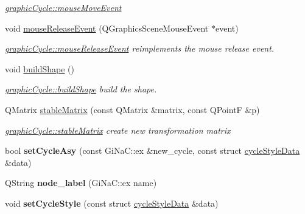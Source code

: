 \begin{DoxyCompactItemize}
\begin{DoxyCompactList}\small\item\em \mbox{\hyperlink{classgraphic_cycle_aec6514c9578de68150bf2eea9b4e80c4}{graphic\+Cycle\+::mouse\+Move\+Event}} \end{DoxyCompactList}\item 
void \mbox{\hyperlink{classgraphic_cycle_a10c7318e9cf6d79e0aad3eec5c1d697a}{mouse\+Release\+Event}} (Q\+Graphics\+Scene\+Mouse\+Event $\ast$event)
\begin{DoxyCompactList}\small\item\em \mbox{\hyperlink{classgraphic_cycle_a10c7318e9cf6d79e0aad3eec5c1d697a}{graphic\+Cycle\+::mouse\+Release\+Event}} reimplements the mouse release event. \end{DoxyCompactList}\item 
void \mbox{\hyperlink{classgraphic_cycle_ac3a007a95334380db1bcd9b8082cb36c}{build\+Shape}} ()
\begin{DoxyCompactList}\small\item\em \mbox{\hyperlink{classgraphic_cycle_ac3a007a95334380db1bcd9b8082cb36c}{graphic\+Cycle\+::build\+Shape}} build the shape. \end{DoxyCompactList}\item 
Q\+Matrix \mbox{\hyperlink{classgraphic_cycle_a1c3a094ad53a3705019c24869340ed51}{stable\+Matrix}} (const Q\+Matrix \&matrix, const Q\+PointF \&p)
\begin{DoxyCompactList}\small\item\em \mbox{\hyperlink{classgraphic_cycle_a1c3a094ad53a3705019c24869340ed51}{graphic\+Cycle\+::stable\+Matrix}} create new transformation matrix \end{DoxyCompactList}\item 
\mbox{\label{classgraphic_cycle_a58385898752cac06fb14fc527f908b8c}} 
bool {\bfseries set\+Cycle\+Asy} (const Gi\+Na\+C\+::ex \&new\+\_\+cycle, const struct \mbox{\hyperlink{structcycle_style_data}{cycle\+Style\+Data}} \&data)
\item 
\mbox{\label{classgraphic_cycle_a51c0fcf1c2b413a20113c0b4e10194d9}} 
Q\+String {\bfseries node\+\_\+label} (Gi\+Na\+C\+::ex name)
\item 
\mbox{\label{classgraphic_cycle_ae407700101f0bd9bfd45bfc382c30ecc}} 
void {\bfseries set\+Cycle\+Style} (const struct \mbox{\hyperlink{structcycle_style_data}{cycle\+Style\+Data}} \&data)
\end{DoxyCompactItemize}


